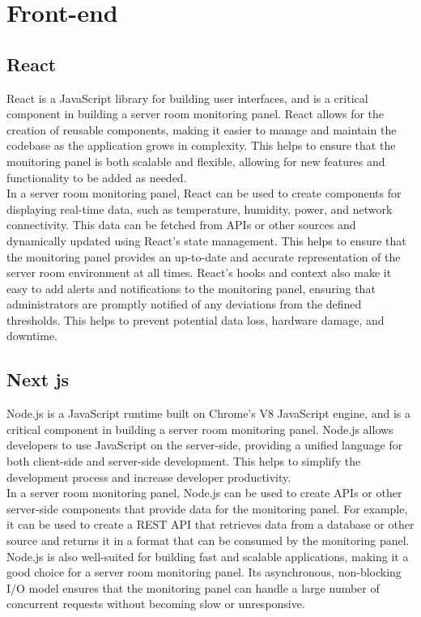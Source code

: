 \section{Front-end}
    \subsection{React}
    React is a JavaScript library for building user interfaces, and is a critical component in building a server room monitoring panel. React allows for the creation of reusable components, making it easier to manage and maintain the codebase as the application grows in complexity. This helps to ensure that the monitoring panel is both scalable and flexible, allowing for new features and functionality to be added as needed.\\
    In a server room monitoring panel, React can be used to create components for displaying real-time data, such as temperature, humidity, power, and network connectivity. This data can be fetched from APIs or other sources and dynamically updated using React's state management. This helps to ensure that the monitoring panel provides an up-to-date and accurate representation of the server room environment at all times. React's hooks and context also make it easy to add alerts and notifications to the monitoring panel, ensuring that administrators are promptly notified of any deviations from the defined thresholds. This helps to prevent potential data loss, hardware damage, and downtime. \cite{react}
    \subsection{Next js}
    Node.js is a JavaScript runtime built on Chrome's V8 JavaScript engine, and is a critical component in building a server room monitoring panel. Node.js allows developers to use JavaScript on the server-side, providing a unified language for both client-side and server-side development. This helps to simplify the development process and increase developer productivity.\\
    In a server room monitoring panel, Node.js can be used to create APIs or other server-side components that provide data for the monitoring panel. For example, it can be used to create a REST API that retrieves data from a database or other source and returns it in a format that can be consumed by the monitoring panel.\\
    Node.js is also well-suited for building fast and scalable applications, making it a good choice for a server room monitoring panel. Its asynchronous, non-blocking I/O model ensures that the monitoring panel can handle a large number of concurrent requests without becoming slow or unresponsive.\cite{nextjs}
